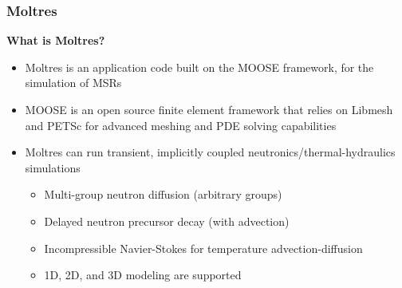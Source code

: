 \begin{frame}
	\frametitle{Moltres}
		\textbf{What is Moltres?}
		\begin{itemize}
			\item Moltres is an application code built on the \gls{MOOSE}
			framework, for the simulation of \glspl{MSR}
			\item \gls{MOOSE} is an open source finite element framework that
			relies on Libmesh and PETSc for advanced meshing and PDE solving
			capabilities
			\item Moltres can run transient, implicitly coupled
			neutronics/thermal-hydraulics simulations
			\begin{itemize}
				\item Multi-group neutron diffusion (arbitrary groups)
				\item Delayed neutron precursor decay (with advection)
				\item Incompressible Navier-Stokes for temperature
				advection-diffusion
				\item 1D, 2D, and 3D modeling are supported
			\end{itemize}
		\end{itemize}
\end{frame}